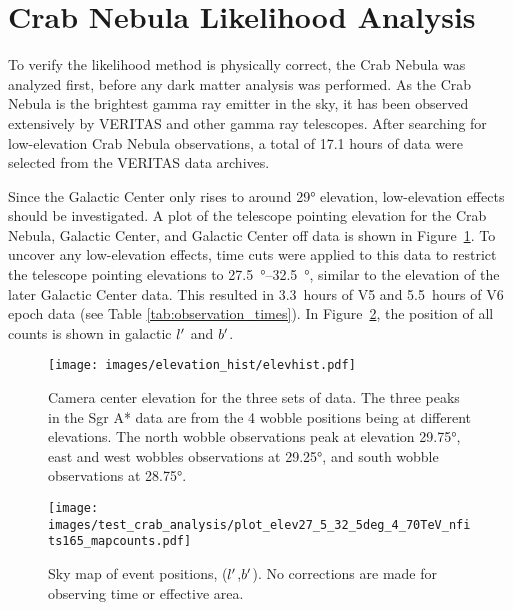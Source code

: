 \section{Crab Nebula Likelihood Analysis}\label{sec:crab_analysis}
To verify the likelihood method is physically correct, the Crab Nebula was analyzed first, before any dark matter analysis was performed.
As the Crab Nebula is the brightest gamma ray emitter in the sky, it has been observed extensively by VERITAS and other gamma ray telescopes.
After searching for low-elevation Crab Nebula observations, a total of 17.1 hours of data were selected from the VERITAS data archives.

Since the Galactic Center only rises to around \ang{29} elevation, low-elevation effects should be investigated.
A plot of the telescope pointing elevation for the Crab Nebula, Galactic Center, and Galactic Center off data is shown in Figure~\ref{fig:datapointingelevations}.
To uncover any low-elevation effects, time cuts were applied to this data to restrict the telescope pointing elevations to \SIrange{27.5}{32.5}{\degree}, similar to the elevation of the later Galactic Center data.
This resulted in \SI{3.3}{hours} of V5 and \SI{5.5}{hours} of V6 epoch data (see Table \ref{tab:observation_times}).
In Figure~\ref{fig:crab_skymap}, the position of all counts is shown in galactic $l'$ and $b'$.

\begin{figure}[hb]
  \centering
  \texttt{[image: images/elevation\_hist/elevhist.pdf]}
  \caption[VERITAS Data Elevation Exposure]{
    Camera center elevation for the three sets of data.
    The three peaks in the Sgr A* data are from the 4 wobble positions being at different elevations.
    The north wobble observations peak at elevation \nicetilde\ang{29.75}, east and west wobbles observations at \nicetilde\ang{29.25}, and south wobble observations at \nicetilde\ang{28.75}.
  }
  \label{fig:datapointingelevations}
\end{figure}

  
\begin{figure}[bt]
  \centering
  \texttt{[image: images/test\_crab\_analysis/plot\_elev27\_5\_32\_5deg\_4\_70TeV\_nfits165\_mapcounts.pdf]}
  \caption[Crab Nebula Counts Sky Map]
  {
    Sky map of event positions, ($l'$,$b'$).
    No corrections are made for observing time or effective area.
  }
  \label{fig:crab_skymap}
\end{figure}

